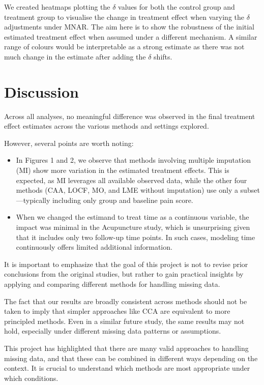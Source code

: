 \documentclass{article}
\begin{document}
We created heatmaps plotting the \(\delta\) values for both the control
group and treatment group to visualise the change in treatment effect
when varying the \(\delta\) adjustments under MNAR. The aim here is to
show the robustness of the initial estimated treatment effect when
assumed under a different mechanism. A similar range of colours would be
interpretable as a strong estimate as there was not much change in the
estimate after adding the \(\delta\) shifts.

\section{Discussion}\label{discussion}

Across all analyses, no meaningful difference was observed in the final
treatment effect estimates across the various methods and settings
explored.

However, several points are worth noting:

\begin{itemize}
\item
  In Figures 1 and 2, we observe that methods involving multiple
  imputation (MI) show more variation in the estimated treatment
  effects. This is expected, as MI leverages all available observed
  data, while the other four methods (CAA, LOCF, MO, and LME without
  imputation) use only a subset---typically including only group and
  baseline pain score.
\item
  When we changed the estimand to treat time as a continuous variable,
  the impact was minimal in the Acupuncture study, which is unsurprising
  given that it includes only two follow-up time points. In such cases,
  modeling time continuously offers limited additional information.
\end{itemize}

It is important to emphasize that the goal of this project is not to
revise prior conclusions from the original studies, but rather to gain
practical insights by applying and comparing different methods for
handling missing data.

The fact that our results are broadly consistent across methods should
not be taken to imply that simpler approaches like CCA are equivalent to
more principled methods. Even in a similar future study, the same
results may not hold, especially under different missing data patterns
or assumptions.

This project has highlighted that there are many valid approaches to
handling missing data, and that these can be combined in different ways
depending on the context. It is crucial to understand which methods are
most appropriate under which conditions.
\end{document}
